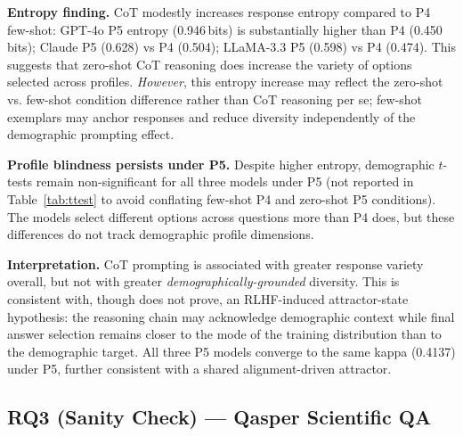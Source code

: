 \documentclass[12pt,a4paper]{article}
\begin{document}
\textbf{Entropy finding.}
CoT modestly increases response entropy compared to P4 few-shot:
GPT-4o P5 entropy (0.946\,bits) is substantially higher than P4
(0.450\,bits); Claude P5 (0.628) vs P4 (0.504); LLaMA-3.3 P5 (0.598)
vs P4 (0.474).
This suggests that zero-shot CoT reasoning does increase the variety
of options selected across profiles.
\emph{However}, this entropy increase may reflect the zero-shot vs.
few-shot condition difference rather than CoT reasoning per se;
few-shot exemplars may anchor responses and reduce diversity independently
of the demographic prompting effect.

\textbf{Profile blindness persists under P5.}
Despite higher entropy, demographic $t$-tests remain non-significant
for all three models under P5 (not reported in Table~\ref{tab:ttest}
to avoid conflating few-shot P4 and zero-shot P5 conditions).
The models select different options across questions more than P4 does,
but these differences do not track demographic profile dimensions.

\textbf{Interpretation.}
CoT prompting is associated with greater response variety overall,
but not with greater \emph{demographically-grounded} diversity.
This is consistent with, though does not prove, an RLHF-induced
attractor-state hypothesis: the reasoning chain may acknowledge
demographic context while final answer selection remains closer to
the mode of the training distribution than to the demographic target.
All three P5 models converge to the same kappa (0.4137) under P5,
further consistent with a shared alignment-driven attractor.

\subsection{RQ3 (Sanity Check) --- Qasper Scientific QA}
\label{sec:results:qasper}
\end{document}
